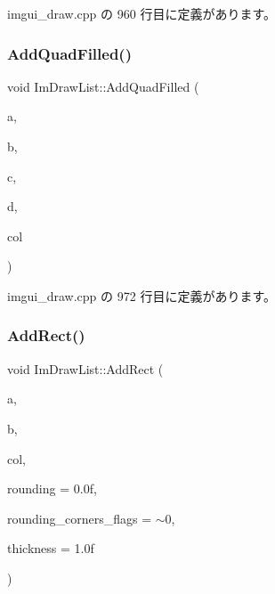  imgui\+\_\+draw.\+cpp の 960 行目に定義があります。

\mbox{\label{struct_im_draw_list_abefdc71c2dc6b6331193aee3ff680ed0}} 
\subsubsection{\texorpdfstring{Add\+Quad\+Filled()}{AddQuadFilled()}}
{\footnotesize\ttfamily void Im\+Draw\+List\+::\+Add\+Quad\+Filled (\begin{DoxyParamCaption}\item[{const \mbox{\hyperlink{struct_im_vec2}{Im\+Vec2}} \&}]{a,  }\item[{const \mbox{\hyperlink{struct_im_vec2}{Im\+Vec2}} \&}]{b,  }\item[{const \mbox{\hyperlink{struct_im_vec2}{Im\+Vec2}} \&}]{c,  }\item[{const \mbox{\hyperlink{struct_im_vec2}{Im\+Vec2}} \&}]{d,  }\item[{\mbox{\hyperlink{imgui_8h_a118cff4eeb8d00e7d07ce3d6460eed36}{Im\+U32}}}]{col }\end{DoxyParamCaption})}



 imgui\+\_\+draw.\+cpp の 972 行目に定義があります。

\mbox{\label{struct_im_draw_list_a6738c7d0b696273a37808554e1f15a0a}} 
\subsubsection{\texorpdfstring{Add\+Rect()}{AddRect()}}
{\footnotesize\ttfamily void Im\+Draw\+List\+::\+Add\+Rect (\begin{DoxyParamCaption}\item[{const \mbox{\hyperlink{struct_im_vec2}{Im\+Vec2}} \&}]{a,  }\item[{const \mbox{\hyperlink{struct_im_vec2}{Im\+Vec2}} \&}]{b,  }\item[{\mbox{\hyperlink{imgui_8h_a118cff4eeb8d00e7d07ce3d6460eed36}{Im\+U32}}}]{col,  }\item[{float}]{rounding = {\ttfamily 0.0f},  }\item[{int}]{rounding\+\_\+corners\+\_\+flags = {\ttfamily $\sim$0},  }\item[{float}]{thickness = {\ttfamily 1.0f} }\end{DoxyParamCaption})}



